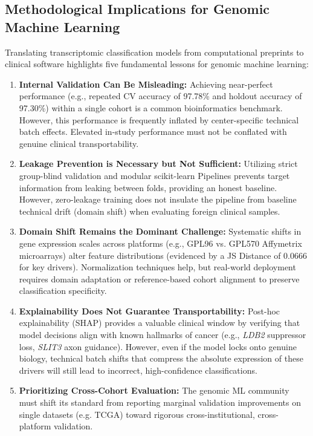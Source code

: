 \documentclass[journal,10pt]{IEEEtran}
\begin{document}
\subsection{Methodological Implications for Genomic Machine Learning}
Translating transcriptomic classification models from computational preprints to clinical software highlights five fundamental lessons for genomic machine learning:
\begin{enumerate}
    \item \textbf{Internal Validation Can Be Misleading:} Achieving near-perfect performance (e.g., repeated CV accuracy of 97.78\% and holdout accuracy of 97.30\%) within a single cohort is a common bioinformatics benchmark. However, this performance is frequently inflated by center-specific technical batch effects. Elevated in-study performance must not be conflated with genuine clinical transportability.
    \item \textbf{Leakage Prevention is Necessary but Not Sufficient:} Utilizing strict group-blind validation and modular scikit-learn Pipelines prevents target information from leaking between folds, providing an honest baseline. However, zero-leakage training does not insulate the pipeline from baseline technical drift (domain shift) when evaluating foreign clinical samples.
    \item \textbf{Domain Shift Remains the Dominant Challenge:} Systematic shifts in gene expression scales across platforms (e.g., GPL96 vs. GPL570 Affymetrix microarrays) alter feature distributions (evidenced by a JS Distance of 0.0666 for key drivers). Normalization techniques help, but real-world deployment requires domain adaptation or reference-based cohort alignment to preserve classification specificity.
    \item \textbf{Explainability Does Not Guarantee Transportability:} Post-hoc explainability (SHAP) provides a valuable clinical window by verifying that model decisions align with known hallmarks of cancer (e.g., \textit{LDB2} suppressor loss, \textit{SLIT3} axon guidance). However, even if the model locks onto genuine biology, technical batch shifts that compress the absolute expression of these drivers will still lead to incorrect, high-confidence classifications.
    \item \textbf{Prioritizing Cross-Cohort Evaluation:} The genomic ML community must shift its standard from reporting marginal validation improvements on single datasets (e.g. TCGA) toward rigorous cross-institutional, cross-platform validation.
\end{enumerate}
\end{document}
